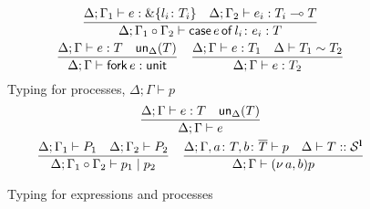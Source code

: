 \begin{figure}[t]
\begin{gather*}
    \frac{
      \Delta;\Gamma_1 \vdash e : \&\{l_i\colon T_i\} \quad \Delta;\Gamma_2 \vdash e_i
      : T_i \multimap T
    }{
      \Delta;\Gamma_1\circ  \Gamma_2 \vdash \mathsf{case}\,{e}\,\mathsf{of}\,{l_i\colon e_i} : T
    }
    \\
    \frac{
      \Delta;\Gamma \vdash e : T
      \quad
      \mathsf{un}_\Delta(T)
    }{
      \Delta;\Gamma \vdash \mathsf{fork}\,e : \mathsf{unit}
    }
    \quad
    \frac{
      \Delta;\Gamma \vdash e : T_1 \quad \Delta \vdash T_1 \sim T_2
    }{
      \Delta;\Gamma \vdash e : T_2
    }
  \end{gather*}
   Typing for processes, $\Delta;\Gamma \vdash p$
  \begin{gather*}
    \frac{
      \Delta;\Gamma \vdash e : T \quad \mathsf{un}_\Delta(T)
    }{
      \Delta;\Gamma \vdash e
    }
    \\
    \frac{
      \Delta;\Gamma_1 \vdash P_1 \quad \Delta;\Gamma_2 \vdash P_2
    }{
      \Delta;\Gamma_1\circ  \Gamma_2 \vdash p_1 \mid p_2
    }
    \quad
    \frac{
      \Delta;\Gamma, a\colon T, b \colon \overline{T} \vdash p
            \quad
      \Delta \vdash T::\mathcal S^{\mathbf{l}}
    }{
      \Delta;\Gamma \vdash (\nu\,{a},b)p
    }
  \end{gather*}
  \caption{Typing for expressions and processes}
  \label{fig:typing}
\end{figure}

